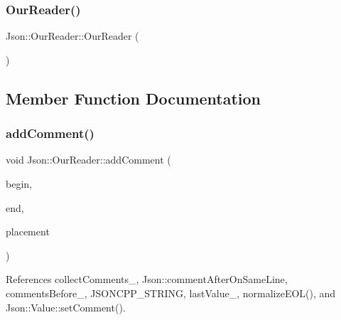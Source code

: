 \subsubsection{\texorpdfstring{Our\+Reader()}{OurReader()}\hspace{0.1cm}{\footnotesize\ttfamily [2/2]}}
{\footnotesize\ttfamily Json\+::\+Our\+Reader\+::\+Our\+Reader (\begin{DoxyParamCaption}\item[{\hyperlink{classJson_1_1OurReader}{Our\+Reader} const \&}]{ }\end{DoxyParamCaption})\hspace{0.3cm}{\ttfamily [private]}}



\subsection{Member Function Documentation}
\mbox{\label{classJson_1_1OurReader_ad7318c37469a9106069a236fb4b10e1f_ad7318c37469a9106069a236fb4b10e1f}} 
\subsubsection{\texorpdfstring{add\+Comment()}{addComment()}}
{\footnotesize\ttfamily void Json\+::\+Our\+Reader\+::add\+Comment (\begin{DoxyParamCaption}\item[{\hyperlink{classJson_1_1OurReader_a1bdc7bbc52ba87cae6b19746f2ee0189_a1bdc7bbc52ba87cae6b19746f2ee0189}{Location}}]{begin,  }\item[{\hyperlink{classJson_1_1OurReader_a1bdc7bbc52ba87cae6b19746f2ee0189_a1bdc7bbc52ba87cae6b19746f2ee0189}{Location}}]{end,  }\item[{\hyperlink{namespaceJson_a4fc417c23905b2ae9e2c47d197a45351_a4fc417c23905b2ae9e2c47d197a45351}{Comment\+Placement}}]{placement }\end{DoxyParamCaption})\hspace{0.3cm}{\ttfamily [private]}}



References collect\+Comments\+\_\+, Json\+::comment\+After\+On\+Same\+Line, comments\+Before\+\_\+, J\+S\+O\+N\+C\+P\+P\+\_\+\+S\+T\+R\+I\+NG, last\+Value\+\_\+, normalize\+E\+O\+L(), and Json\+::\+Value\+::set\+Comment().



